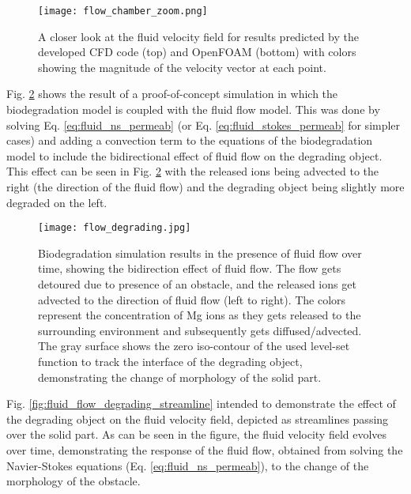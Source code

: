 \begin{figure}[h]
\centering
\medskip
\texttt{[image: flow\_chamber\_zoom.png]}
\caption[Comparing flow field results of developed CFD code and OpenFOAM - zoomed view]{A closer look at the fluid velocity field for results predicted by the developed CFD code (top) and OpenFOAM (bottom) with colors showing the magnitude of the velocity vector at each point.} \label{fig:fluid_flow_chamber_zoom}
\end{figure}

Fig. \ref{fig:fluid_flow_degrading} shows the result of a proof-of-concept simulation in which the biodegradation model \cite{Barzegari2021} is coupled with the fluid flow model. This was done by solving Eq. \ref{eq:fluid_ns_permeab} (or Eq. \ref{eq:fluid_stokes_permeab} for simpler cases) and adding a convection term to the equations of the biodegradation model to include the bidirectional effect of fluid flow on the degrading object. This effect can be seen in Fig. \ref{fig:fluid_flow_degrading} with the released ions being advected to the right (the direction of the fluid flow) and the degrading object being slightly more degraded on the left.

\begin{figure}[h]
\centering
\medskip
\texttt{[image: flow\_degrading.jpg]}
\caption[Biodegradation simulation results in the presence of fluid flow]{Biodegradation simulation results in the presence of fluid flow over time, showing the bidirection effect of fluid flow. The flow gets detoured due to presence of an obstacle, and the released ions get advected to the direction of fluid flow (left to right). The colors represent the concentration of Mg ions as they gets released to the surrounding environment and subsequently gets diffused/advected. The gray surface shows the zero iso-contour of the used level-set function to track the interface of the degrading object, demonstrating the change of morphology of the solid part.} \label{fig:fluid_flow_degrading}
\end{figure}

Fig. \ref{fig:fluid_flow_degrading_streamline} intended to demonstrate the effect of the degrading object on the fluid velocity field, depicted as streamlines passing over the solid part. As can be seen in the figure, the fluid velocity field evolves over time, demonstrating the response of the fluid flow, obtained from solving the Navier-Stokes equations (Eq. \ref{eq:fluid_ns_permeab}), to the change of the morphology of the obstacle. 


